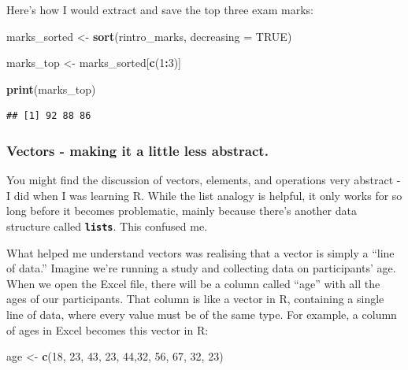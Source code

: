 \documentclass[
]{book}
\newenvironment{Shaded}{\begin{snugshade}}{\end{snugshade}}
\newcommand{\AttributeTok}[1]{\textcolor[rgb]{0.13,0.29,0.53}{#1}}
\newcommand{\ConstantTok}[1]{\textcolor[rgb]{0.56,0.35,0.01}{#1}}
\newcommand{\DecValTok}[1]{\textcolor[rgb]{0.00,0.00,0.81}{#1}}
\newcommand{\FunctionTok}[1]{\textcolor[rgb]{0.13,0.29,0.53}{\textbf{#1}}}
\newcommand{\NormalTok}[1]{#1}
\newcommand{\OtherTok}[1]{\textcolor[rgb]{0.56,0.35,0.01}{#1}}
\newcommand{\SpecialCharTok}[1]{\textcolor[rgb]{0.81,0.36,0.00}{\textbf{#1}}}
\begin{document}
Here's how I would extract and save the top three exam marks:

\begin{Shaded}
\begin{Highlighting}[]
\NormalTok{marks\_sorted }\OtherTok{\textless{}{-}} \FunctionTok{sort}\NormalTok{(rintro\_marks, }\AttributeTok{decreasing =} \ConstantTok{TRUE}\NormalTok{)}

\NormalTok{marks\_top }\OtherTok{\textless{}{-}}\NormalTok{ marks\_sorted[}\FunctionTok{c}\NormalTok{(}\DecValTok{1}\SpecialCharTok{:}\DecValTok{3}\NormalTok{)]}

\FunctionTok{print}\NormalTok{(marks\_top)}
\end{Highlighting}
\end{Shaded}

\begin{verbatim}
## [1] 92 88 86
\end{verbatim}

\subsubsection{Vectors - making it a little less abstract.}\label{vectors---making-it-a-little-less-abstract.}

You might find the discussion of vectors, elements, and operations very abstract - I did when I was learning R. While the list analogy is helpful, it only works for so long before it becomes problematic, mainly because there's another data structure called \textbf{\texttt{lists}}. This confused me.

What helped me understand vectors was realising that a vector is simply a ``line of data.'' Imagine we're running a study and collecting data on participants' age. When we open the Excel file, there will be a column called ``age'' with all the ages of our participants. That column is like a vector in R, containing a single line of data, where every value must be of the same type. For example, a column of ages in Excel becomes this vector in R:

\begin{Shaded}
\begin{Highlighting}[]
\NormalTok{age }\OtherTok{\textless{}{-}} \FunctionTok{c}\NormalTok{(}\DecValTok{18}\NormalTok{, }\DecValTok{23}\NormalTok{, }\DecValTok{43}\NormalTok{, }\DecValTok{23}\NormalTok{, }\DecValTok{44}\NormalTok{,}\DecValTok{32}\NormalTok{, }\DecValTok{56}\NormalTok{, }\DecValTok{67}\NormalTok{, }\DecValTok{32}\NormalTok{, }\DecValTok{23}\NormalTok{)}
\end{Highlighting}
\end{Shaded}
\end{document}

